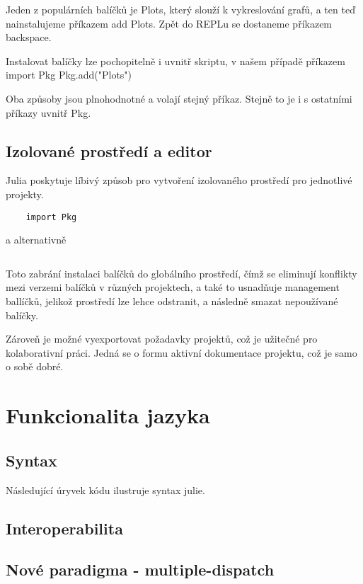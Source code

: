 \documentclass{article}
\begin{document}
Jeden z populárních balíčků je Plots, který slouží k vykreslování grafů, a ten teď nainstalujeme příkazem add Plots.
Zpět do REPLu se dostaneme příkazem backspace.

Instalovat balíčky lze pochopitelně i uvnitř skriptu, v našem případě příkazem
import Pkg
Pkg.add("Plots")

Oba způsoby jsou plnohodnotné a volají stejný příkaz. Stejně to je i s ostatními příkazy uvnitř Pkg.

\subsection{Izolované prostředí a editor}

Julia poskytuje líbivý způsob pro vytvoření izolovaného prostředí pro jednotlivé projekty.
\begin{lstlisting}
    import Pkg
\end{lstlisting}
a alternativně


\begin{lstlisting}
\end{lstlisting}

Toto zabrání instalaci balíčků do globálního prostředí,
čímž se eliminují konflikty mezi verzemi balíčků v různých projektech,
a také to usnadňuje management ballíčků, jelikož prostředí lze lehce odstranit,
a následně smazat nepoužívané balíčky.

Zároveň je možné vyexportovat požadavky projektů, což je užitečné pro kolaborativní práci.
Jedná se o formu aktivní dokumentace projektu, což je samo o sobě dobré.

\section{Funkcionalita jazyka}
\subsection{Syntax}
Následující úryvek kódu ilustruje syntax julie.
\subsection{Interoperabilita}
\subsection{Nové paradigma - multiple-dispatch}
\end{document}
